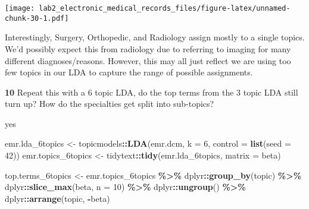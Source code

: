 \documentclass[
]{article}
\newenvironment{Shaded}{\begin{snugshade}}{\end{snugshade}}
\newcommand{\AttributeTok}[1]{\textcolor[rgb]{0.13,0.29,0.53}{#1}}
\newcommand{\DecValTok}[1]{\textcolor[rgb]{0.00,0.00,0.81}{#1}}
\newcommand{\FunctionTok}[1]{\textcolor[rgb]{0.13,0.29,0.53}{\textbf{#1}}}
\newcommand{\NormalTok}[1]{#1}
\newcommand{\OtherTok}[1]{\textcolor[rgb]{0.56,0.35,0.01}{#1}}
\newcommand{\SpecialCharTok}[1]{\textcolor[rgb]{0.81,0.36,0.00}{\textbf{#1}}}
\newcommand{\StringTok}[1]{\textcolor[rgb]{0.31,0.60,0.02}{#1}}
\begin{document}
\texttt{[image: lab2\_electronic\_medical\_records\_files/figure-latex/unnamed-chunk-30-1.pdf]}

Interestingly, Surgery, Orthopedic, and Radiology assign mostly to a
single topics. We'd possibly expect this from radiology due to referring
to imaging for many different diagnoses/reasons. However, this may all
just reflect we are using too few topics in our LDA to capture the range
of possible assignments.

\textbf{10} Repeat this with a 6 topic LDA, do the top terms from the 3
topic LDA still turn up? How do the specialties get split into
sub-topics?

yes

\begin{Shaded}
\begin{Highlighting}[]
\NormalTok{emr.lda\_6topics }\OtherTok{\textless{}{-}}\NormalTok{ topicmodels}\SpecialCharTok{::}\FunctionTok{LDA}\NormalTok{(emr.dcm, }\AttributeTok{k =} \DecValTok{6}\NormalTok{, }\AttributeTok{control =} \FunctionTok{list}\NormalTok{(}\AttributeTok{seed =} \DecValTok{42}\NormalTok{))}
\NormalTok{emr.topics\_6topics }\OtherTok{\textless{}{-}}\NormalTok{ tidytext}\SpecialCharTok{::}\FunctionTok{tidy}\NormalTok{(emr.lda\_6topics, }\AttributeTok{matrix =} \StringTok{\textquotesingle{}beta\textquotesingle{}}\NormalTok{)}


\NormalTok{top.terms\_6topics }\OtherTok{\textless{}{-}}\NormalTok{ emr.topics\_6topics }\SpecialCharTok{\%\textgreater{}\%}
\NormalTok{  dplyr}\SpecialCharTok{::}\FunctionTok{group\_by}\NormalTok{(topic) }\SpecialCharTok{\%\textgreater{}\%}
\NormalTok{  dplyr}\SpecialCharTok{::}\FunctionTok{slice\_max}\NormalTok{(beta, }\AttributeTok{n =} \DecValTok{10}\NormalTok{) }\SpecialCharTok{\%\textgreater{}\%}
\NormalTok{  dplyr}\SpecialCharTok{::}\FunctionTok{ungroup}\NormalTok{() }\SpecialCharTok{\%\textgreater{}\%}
\NormalTok{  dplyr}\SpecialCharTok{::}\FunctionTok{arrange}\NormalTok{(topic, }\SpecialCharTok{{-}}\NormalTok{beta)}


\end{Highlighting}
\end{Shaded}
\end{document}
